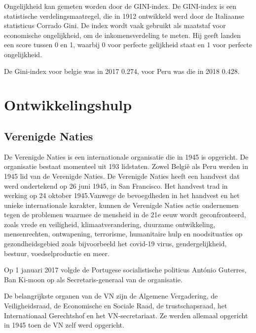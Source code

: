 Ongelijkheid kan gemeten worden door de GINI-index. De GINI-index is een statistische verdelingsmaatregel, die in 1912 ontwikkeld werd door de Italiaanse statisticus Corrado Gini. De index wordt vaak gebruikt als maatstaf voor economische ongelijkheid, om de inkomensverdeling te meten. Hij geeft landen een score tussen 0 en 1, waarbij 0 voor perfecte gelijkheid staat en 1 voor perfecte ongelijkheid.  \autocite{Chappelow2020}

De Gini-index voor belgie was in 2017 0.274, voor Peru was die in 2018 0.428. \autocite{Bank2018}


\section{Ontwikkelingshulp}

\subsection{Verenigde Naties}
De Verenigde Naties is een internationale organisatie die in 1945 is opgericht. De organisatie bestaat momenteel uit 193 lidstaten. Zowel België als Peru werden in 1945 lid van de Verenigde Naties. De Verenigde Naties heeft een handvest dat werd ondertekend op 26 juni 1945, in San Francisco. Het handvest trad in werking op 24 oktober 1945.Vanwege de bevoegdheden in het handvest en het unieke internationale karakter, kunnen de Verenigde Naties actie ondernemen tegen de problemen waarmee de mensheid in de 21e eeuw wordt geconfronteerd, zoals vrede en veiligheid, klimaatverandering, duurzame ontwikkeling, mensenrechten, ontwapening, terrorisme, humanitaire hulp en noodsituaties op gezondheidsgebied zoals bijvoorbeeld het covid-19 virus, gendergelijkheid, bestuur, voedselproductie en meer. \autocite{Nations2020}

Op 1 januari 2017 volgde de Portugese socialistische politicus António Guterres, Ban Ki-moon op als Secretaris-generaal van de organisatie. 

De belangrijkste organen van de VN zijn de Algemene Vergadering, de Veiligheidsraad, de Economische en Sociale Raad, de trustschapsraad, het Internationaal Gerechtshof en het VN-secretariaat. Ze werden allemaal opgericht in 1945 toen de VN zelf werd opgericht. 

